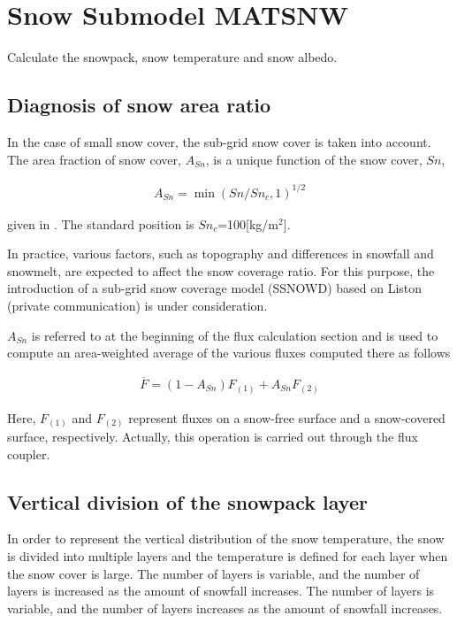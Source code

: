 \hypertarget{snow-submodel-matsnw}{%
\section{Snow Submodel MATSNW}\label{snow-submodel-matsnw}}

Calculate the snowpack, snow temperature and snow albedo.

\hypertarget{diagnosis-of-snow-area-ratio}{%
\subsection{Diagnosis of snow area
ratio}\label{diagnosis-of-snow-area-ratio}}

In the case of small snow cover, the sub-grid snow cover is taken into
account. The area fraction of snow cover, \(A_{Sn}\), is a unique
function of the snow cover, \(Sn\),

\begin{eqnarray}
 A_{Sn} = \min(Sn/Sn_{c}, 1)^{1/2}
\end{eqnarray}

given in . The standard position is \(Sn_c\)=100{[}kg/m\(^2\){]}.

In practice, various factors, such as topography and differences in
snowfall and snowmelt, are expected to affect the snow coverage ratio.
For this purpose, the introduction of a sub-grid snow coverage model
(SSNOWD) based on Liston (private communication) is under consideration.

\(A_{Sn}\) is referred to at the beginning of the flux calculation
section and is used to compute an area-weighted average of the various
fluxes computed there as follows

\begin{eqnarray}
 \overline{F} = (1-A_{Sn}) F_{(1)} + A_{Sn} F_{(2)}
\end{eqnarray}

Here, \(F_{(1)}\) and \(F_{(2)}\) represent fluxes on a snow-free
surface and a snow-covered surface, respectively. Actually, this
operation is carried out through the flux coupler.

\hypertarget{vertical-division-of-the-snowpack-layer}{%
\subsection{Vertical division of the snowpack
layer}\label{vertical-division-of-the-snowpack-layer}}

In order to represent the vertical distribution of the snow temperature,
the snow is divided into multiple layers and the temperature is defined
for each layer when the snow cover is large. The number of layers is
variable, and the number of layers is increased as the amount of
snowfall increases. The number of layers is variable, and the number of
layers increases as the amount of snowfall increases.

